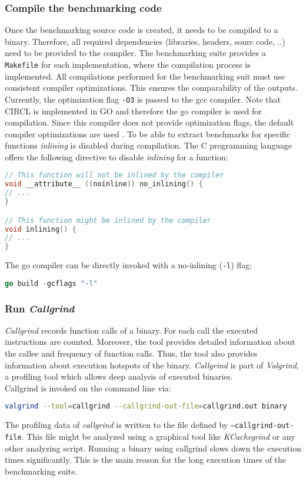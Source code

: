 \subsubsection{Compile the benchmarking code}
Once the benchmarking source code is created, it needs to be compiled to a binary. Therefore, all required dependencies (libraries, headers, sourc code, ..) need to be provided to the compiler. The benchmarking suite provides a \texttt{Makefile} for each implementation, where the compilation process is implemented.
All compilations performed for the benchmarking suit must use consistent compiler optimizations. This ensures the comparability of the outputs. Currently, the optimization flag \texttt{-O3} is passed to the gcc compiler. Note that CIRCL is implemented in GO and therefore the go compiler is used for compilation. Since this compiler does not provide optimization flags, the default compiler optimizations are used \parencite{gowiki2020compiler}.
To be able to extract benchmarks for specific functions \textit{inlining} is disabled during compilation. The C programming language offers the following directive to disable \textit{inlining} for a function:
\begin{lstlisting}[language=C]
// This function will not be inlined by the compiler
void __attribute__ ((noinline)) no_inlining() {
// ...
}

// This function might be inlined by the compiler
void inlining() {
// ...
}
\end{lstlisting}
The go compiler can be directly invoked with a no-inlining (\texttt{-l}) flag:
\begin{lstlisting}[language=Go]
go build -gcflags "-l"
\end{lstlisting}

\subsubsection{Run \textit{Callgrind}}
\textit{Callgrind} records function calls of a binary. For each call the executed instructions are counted. Moreover, the tool provides detailed information about the callee and frequency of function calls. Thus, the tool also provides information about execution hotspots of the binary. \textit{Callgrind} is part of \textit{Valgrind}, a profiling tool which allows deep analysis of executed binaries.\\
Callgrind is invoked on the command line via:
\begin{lstlisting}[language=Bash]
valgrind --tool=callgrind --callgrind-out-file=callgrind.out binary
\end{lstlisting}
The profiling data of \textit{callgrind} is written to the file defined by \texttt{--callgrind-out-file}. This file might be analyzed using a graphical tool like \textit{KCachegrind} or any other analyzing script.
Running a binary using callgrind slows down the execution times significantly. This is the main reason for the long execution times of the benchmarking suite. 

